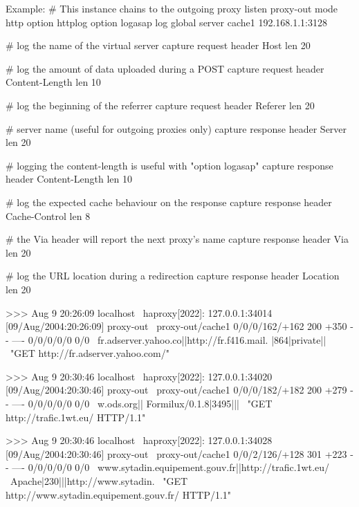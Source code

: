   \begin{example}{Example:}
        # This instance chains to the outgoing proxy
        listen proxy-out
            mode http
            option httplog
            option logasap
            log global
            server cache1 192.168.1.1:3128

            # log the name of the virtual server
            capture request  header Host len 20

            # log the amount of data uploaded during a POST
            capture request  header Content-Length len 10

            # log the beginning of the referrer
            capture request  header Referer len 20

            # server name (useful for outgoing proxies only)
            capture response header Server len 20

            # logging the content-length is useful with "option logasap"
            capture response header Content-Length len 10

            # log the expected cache behaviour on the response
            capture response header Cache-Control len 8

            # the Via header will report the next proxy's name
            capture response header Via len 20

            # log the URL location during a redirection
            capture response header Location len 20

    >>> Aug  9 20:26:09 localhost \
          haproxy[2022]: 127.0.0.1:34014 [09/Aug/2004:20:26:09] proxy-out \
          proxy-out/cache1 0/0/0/162/+162 200 +350 - - ---- 0/0/0/0/0 0/0 \
          {fr.adserver.yahoo.co||http://fr.f416.mail.} {|864|private||} \
          "GET http://fr.adserver.yahoo.com/"

    >>> Aug  9 20:30:46 localhost \
          haproxy[2022]: 127.0.0.1:34020 [09/Aug/2004:20:30:46] proxy-out \
          proxy-out/cache1 0/0/0/182/+182 200 +279 - - ---- 0/0/0/0/0 0/0 \
          {w.ods.org||} {Formilux/0.1.8|3495|||} \
          "GET http://trafic.1wt.eu/ HTTP/1.1"

    >>> Aug  9 20:30:46 localhost \
          haproxy[2022]: 127.0.0.1:34028 [09/Aug/2004:20:30:46] proxy-out \
          proxy-out/cache1 0/0/2/126/+128 301 +223 - - ---- 0/0/0/0/0 0/0 \
          {www.sytadin.equipement.gouv.fr||http://trafic.1wt.eu/} \
          {Apache|230|||http://www.sytadin.} \
          "GET http://www.sytadin.equipement.gouv.fr/ HTTP/1.1"
\end{example}

